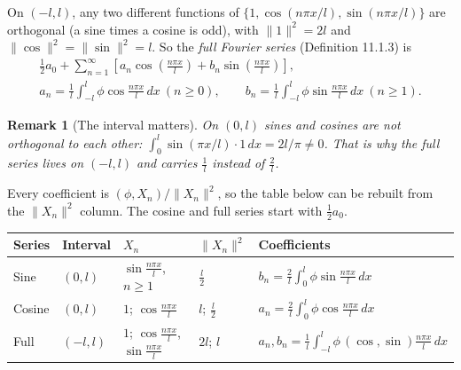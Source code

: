 \documentclass{article}
\newtheorem{remark}{Remark}
\begin{document}
On $(-l,l)$, any two different functions of $\{1, \cos(n\pi x/l), \sin(n\pi x/l)\}$ are orthogonal (a sine times a cosine is odd), with $\|1\|^2 = 2l$ and $\|\cos\|^2 = \|\sin\|^2 = l$. So the \emph{full Fourier series} (Definition 11.1.3) is
\begin{gather}
    \frac12 a_0 + \sum_{n=1}^\infty\left[a_n\cos\left(\frac{n\pi x}{l}\right) + b_n\sin\left(\frac{n\pi x}{l}\right)\right], \\
    a_n = \frac1l\int_{-l}^l\phi\cos\frac{n\pi x}{l}\,dx \ (n \geq 0), \qquad b_n = \frac1l\int_{-l}^l\phi\sin\frac{n\pi x}{l}\,dx \ (n \geq 1).
\end{gather}
\begin{remark}[The interval matters]
    On $(0,l)$ sines and cosines are not orthogonal to each other: $\int_0^l\sin(\pi x/l)\cdot 1\,dx = 2l/\pi \neq 0$. That is why the full series lives on $(-l,l)$ and carries $\frac1l$ instead of $\frac2l$.
\end{remark}
Every coefficient is $(\phi, X_n)/\|X_n\|^2$, so the table below can be rebuilt from the $\|X_n\|^2$ column. The cosine and full series start with $\frac12a_0$.
\begin{center}
\small
\renewcommand{\arraystretch}{1.4}
\begin{tabular}{lllll}
    Series & Interval & $X_n$ & $\|X_n\|^2$ & Coefficients \\
    \hline
    Sine & $(0,l)$ & $\sin\frac{n\pi x}{l}$, $n \geq 1$ & $\frac{l}{2}$ & $b_n = \frac{2}{l}\int_0^l\phi\sin\frac{n\pi x}{l}\,dx$ \\
    Cosine & $(0,l)$ & $1$; $\cos\frac{n\pi x}{l}$ & $l$; $\frac{l}{2}$ & $a_n = \frac{2}{l}\int_0^l\phi\cos\frac{n\pi x}{l}\,dx$ \\
    Full & $(-l,l)$ & $1$; $\cos\frac{n\pi x}{l}$, $\sin\frac{n\pi x}{l}$ & $2l$; $l$ & $a_n, b_n = \frac{1}{l}\int_{-l}^l\phi\,(\cos,\sin)\frac{n\pi x}{l}\,dx$
\end{tabular}
\end{center}
\end{document}
